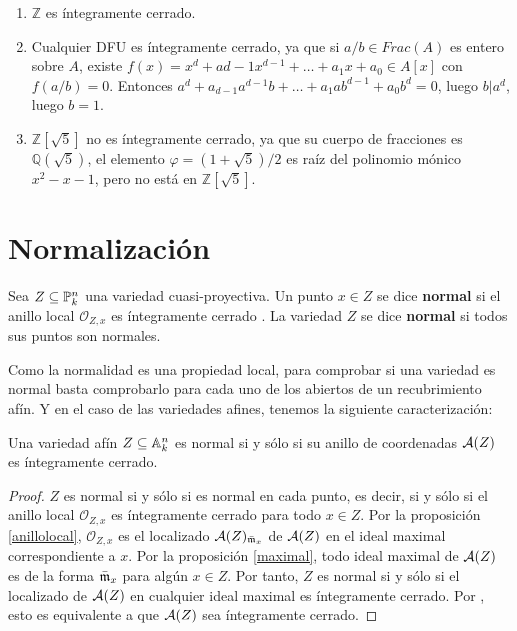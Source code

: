 \documentclass[ACGA.tex]{subfiles}
\begin{document}
\begin{ejs}\mbox{}
\begin{enumerate}
	\item $\mathbb{Z}$ es íntegramente cerrado.
	\item Cualquier DFU es íntegramente cerrado, ya que si $a/b \in Frac(A)$ es entero sobre $A$, existe $f(x) = x^d+a{d-1}x^{d-1}+\dots +a_1x+a_0 \in A[x]$ con $f(a/b) = 0$. Entonces $a^d+a_{d-1}a^{d-1}b+\dots+a_1ab^{d-1}+a_0b^d = 0$, luego $b | a^d$, luego $b=1$.
	\item $\mathbb{Z}[\sqrt{5}] $ no es íntegramente cerrado, ya que su cuerpo de fracciones es $\mathbb{Q}(\sqrt{5})$, el elemento $\varphi = (1+\sqrt{5})/2$ es raíz del polinomio mónico $x^2-x-1$, pero no está en $\mathbb{Z}[\sqrt{5}]$.
\end{enumerate}
\end{ejs}
 
\section{Normalización}

\begin{defi}
 Sea $Z\subseteq\mathbb{P}^n_k$ una variedad cuasi-proyectiva. Un punto $x\in Z$ se dice {\bf normal} si el anillo local ${\mathcal O}_{Z,x}$ es íntegramente cerrado \cite[Capítulo 5]{am}. La variedad $Z$ se dice {\bf normal} si todos sus puntos son normales.
\end{defi}

Como la normalidad es una propiedad local, para comprobar si una variedad es normal basta comprobarlo para cada uno de los abiertos de un recubrimiento afín. Y en el caso de las variedades afines, tenemos la siguiente caracterización:

\begin{prop}
 Una variedad afín $Z\subseteq\mathbb{A}^n_k$ es normal si y sólo si su anillo de coordenadas $\mathcal{A}(Z)$ es íntegramente cerrado.
\end{prop}

\begin{proof}
 $Z$ es normal si y sólo si es normal en cada punto, es decir, si y sólo si el anillo local ${\mathcal O}_{Z,x}$ es íntegramente cerrado para todo $x\in Z$. Por la proposición \ref{anillolocal}, ${\mathcal O}_{Z,x}$ es el localizado $\mathcal{A}(Z)_{\bar{{\mathfrak{m}}}_x}$ de $\mathcal{A}(Z)$ en el ideal maximal correspondiente a $x$. Por la proposición \ref{maximal}, todo ideal maximal de $\mathcal{A}(Z)$ es de la forma $\bar{{\mathfrak{m}}}_x$ para algún $x\in Z$. Por tanto, $Z$ es normal si y sólo si el localizado de $\mathcal{A}(Z)$ en cualquier ideal maximal es íntegramente cerrado. Por \cite[proposición 5.13]{am}, esto es equivalente a que $\mathcal{A}(Z)$ sea íntegramente cerrado.
\end{proof}
\end{document}
